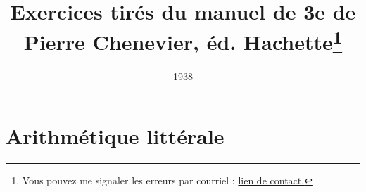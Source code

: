 \documentclass[12 pt]{report}
\author{ }
\title{\Large Exercices tirés du manuel de 3e de Pierre Chenevier, éd. Hachette\footnote{Vous pouvez me signaler les erreurs par courriel : \href{mailto:leturcq.d@orange.fr}{lien de contact.} 
	}
	}
\date{1938}
\theoremstyle{plain}
\newcounter{n}
\begin{document}
	\maketitle 
	
	
%	
% 
% 
% 
% 
% 
% 
% 
% 
% 
% 
% 
% 
% 
% 
% 
\part{Arithmétique littérale}
  
 
 
 
 
% 
% 
% 
% 
% 
% 
% 
% 
% 
% 
% 
% 
% 
% 
% 
 
 
 	
\end{document}
